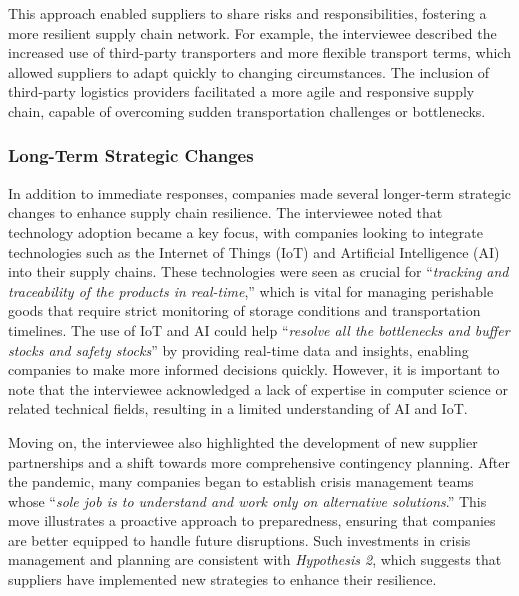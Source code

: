 This approach enabled suppliers to share risks and responsibilities, fostering a more resilient supply chain network. For example, the interviewee described the increased use of third-party transporters and more flexible transport terms, which allowed suppliers to adapt quickly to changing circumstances. The inclusion of third-party logistics providers facilitated a more agile and responsive supply chain, capable of overcoming sudden transportation challenges or bottlenecks.

\subsubsection{Long-Term Strategic Changes}

In addition to immediate responses, companies made several longer-term strategic changes to enhance supply chain resilience. The interviewee noted that technology adoption became a key focus, with companies looking to integrate technologies such as the Internet of Things (IoT) and Artificial Intelligence (AI) into their supply chains. These technologies were seen as crucial for “\textit{tracking and traceability of the products in real-time},” which is vital for managing perishable goods that require strict monitoring of storage conditions and transportation timelines. The use of IoT and AI could help “\textit{resolve all the bottlenecks and buffer stocks and safety stocks}” by providing real-time data and insights, enabling companies to make more informed decisions quickly. However, it is important to note that the interviewee acknowledged a lack of expertise in computer science or related technical fields, resulting in a limited understanding of AI and IoT. 

Moving on, the interviewee also highlighted the development of new supplier partnerships and a shift towards more comprehensive contingency planning. After the pandemic, many companies began to establish crisis management teams whose “\textit{sole job is to understand and work only on alternative solutions}.” This move illustrates a proactive approach to preparedness, ensuring that companies are better equipped to handle future disruptions. Such investments in crisis management and planning are consistent with \textit{Hypothesis 2}, which suggests that suppliers have implemented new strategies to enhance their resilience.

